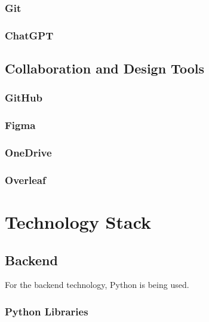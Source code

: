 \subsubsection*{Git}
\label{subsubsec:git}

\subsubsection*{ChatGPT}
\label{subsubsec:chatgpt}

\subsection{Collaboration and Design Tools}
\label{subsec:collaboration-and-design-tools}

\subsubsection*{GitHub}
\label{subsubsec:github}

\subsubsection*{Figma}
\label{subsubsec:figma}

\subsubsection*{OneDrive}
\label{subsubsec:onedrive}

\subsubsection*{Overleaf}
\label{subsubsec:overleaf}

\section{Technology Stack}
\label{sec:technology-stack}

\subsection{Backend}
\label{subsec:backend}

For the backend technology, Python is being used.

\subsubsection*{Python Libraries}
\label{subsubsec:python-libraries}

